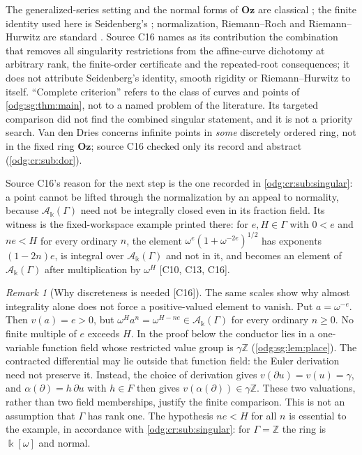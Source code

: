 \documentclass[11pt,oneside]{article}
\numberwithin{equation}{section}
\theoremstyle{definition}
\theoremstyle{remark}
\newtheorem{remark}[remark]{Remark}
\newcommand{\Oz}{\mathbf{Oz}}
\newcommand{\Z}{\mathbb Z}
\newcommand{\src}[1]{\textup{\textsf{\small[#1]}}}
\newcommand{\crA}{\mathcal A_\Bbbk(\Gamma)}
\begin{document}
The generalized-series setting and the normal forms of $\Oz$ are classical
\cite{Conway,Gonshor,LM}; the finite identity used here is Seidenberg's
\cite{Seidenberg}; normalization, Riemann--Roch and Riemann--Hurwitz are standard
\cite{StacksNormal,StacksCurves,StacksRR,StacksRH}. Source C16 names as its contribution
the combination that removes all singularity restrictions from the affine-curve
dichotomy at arbitrary rank, the finite-order certificate and the repeated-root
consequences; it does not attribute Seidenberg's identity, smooth rigidity or
Riemann--Hurwitz to itself. ``Complete criterion'' refers to the class of curves and
points of \cref{odg:sg:thm:main}, not to a named problem of the literature. Its targeted
comparison did not find the combined singular statement, and it is not a priority
search. Van den Dries \cite{vdDries} concerns infinite points in \emph{some} discretely
ordered ring, not in the fixed ring $\Oz$; source C16 checked only its record and
abstract (\cref{odg:cr:sub:dor}).

Source C16's reason for the next step is the one recorded in \cref{odg:cr:sub:singular}:
a point cannot be lifted through the normalization by an appeal to normality, because
$\crA$ need not be integrally closed even in its fraction field. Its witness is the
fixed-workspace example printed there: for $e,H\in\Gamma$ with $0<e$ and $ne<H$ for every
ordinary $n$, the element $\omega^e(1+\omega^{-2e})^{1/2}$ has exponents $(1-2n)e$, is
integral over $\crA$ and not in it, and becomes an element of $\crA$ after multiplication
by $\omega^H$ \src{C10, C13, C16}.

\begin{remark}[Why discreteness is needed \src{C16}]\label{odg:sg:rem:discrete}
The same scales show why almost integrality alone does not force a
positive-valued element to vanish. Put $a=\omega^{-e}$. Then $v(a)=e>0$,
but $\omega^H a^n=\omega^{H-ne}\in\crA$ for every ordinary $n\ge0$.
No finite multiple of $e$ exceeds $H$. In the proof below the conductor
lies in a one-variable function field whose restricted value group is
$\gamma\Z$ (\cref{odg:sg:lem:place}). The contracted differential may
lie outside that function field: the Euler derivation need not preserve it.
Instead, the choice of derivation gives $v(\partial u)=v(u)=\gamma$,
and $\alpha(\partial)=h\,\partial u$ with $h\in F$ then gives
$v(\alpha(\partial))\in\gamma\Z$. These two valuations, rather than
two field memberships, justify the finite comparison. This is not an
assumption that $\Gamma$ has rank one. The hypothesis $ne<H$ for all $n$ is essential to
the example, in accordance with \cref{odg:cr:sub:singular}: for $\Gamma=\Z$ the ring is
$\Bbbk[\omega]$ and normal.
\end{remark}
\end{document}
